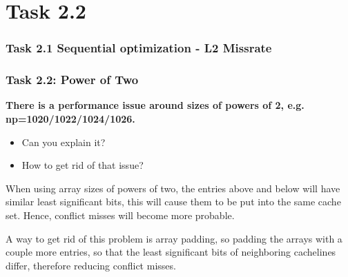 \section{Task 2.2}
\begin{frame}
\frametitle{Task 2.1 Sequential optimization - L2 Missrate}
\end{frame}


\begin{frame}[fragile]
\frametitle{Task 2.2: Power of Two}

\textbf{ There is a performance issue around sizes of powers of 2, e.g. np=1020/1022/1024/1026.}
\begin {itemize}
\item Can you explain it? 
\item How to get rid of that issue?
\end {itemize}

When using array sizes of powers of two, the entries above and below will have similar least significant bits, this will cause them to be put into the same cache set. Hence, conflict misses will become more probable.

A way to get rid of this problem is array padding, so padding the arrays with a couple more entries, so that the least significant bits of neighboring cachelines differ, therefore reducing conflict misses.


\end{frame}

